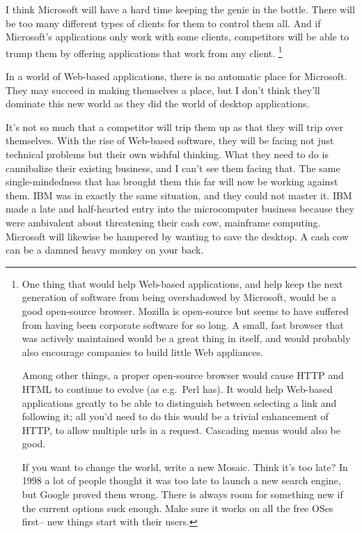\documentclass[12pt]{book}
\begin{document}
I think Microsoft will have a hard time keeping the genie in the bottle.
There will be too many different types of clients for them to control
them all. And if Microsoft's applications only work with some clients,
competitors will be able to trump them by offering applications that
work from any client. \footnote{One thing that would help Web-based applications, and help keep
the next generation of software from being overshadowed by Microsoft,
would be a good open-source browser. Mozilla is open-source but seems to
have suffered from having been corporate software for so long. A small,
fast browser that was actively maintained would be a great thing in
itself, and would probably also encourage companies to build little Web
appliances.

Among other things, a proper open-source browser would cause HTTP and
HTML to continue to evolve (as e.g.~Perl has). It would help Web-based
applications greatly to be able to distinguish between selecting a link
and following it; all you'd need to do this would be a trivial
enhancement of HTTP, to allow multiple urls in a request. Cascading
menus would also be good.

If you want to change the world, write a new Mosaic. Think it's too
late? In 1998 a lot of people thought it was too late to launch a new
search engine, but Google proved them wrong. There is always room for
something new if the current options suck enough. Make sure it works on
all the free OSes first-- new things start with their users.}

In a world of Web-based applications, there is no automatic place for
Microsoft. They may succeed in making themselves a place, but I don't
think they'll dominate this new world as they did the world of desktop
applications.

It's not so much that a competitor will trip them up as that they will
trip over themselves. With the rise of Web-based software, they will be
facing not just technical problems but their own wishful thinking. What
they need to do is cannibalize their existing business, and I can't see
them facing that. The same single-mindedness that has brought them this
far will now be working against them. IBM was in exactly the same
situation, and they could not master it. IBM made a late and
half-hearted entry into the microcomputer business because they were
ambivalent about threatening their cash cow, mainframe computing.
Microsoft will likewise be hampered by wanting to save the desktop. A
cash cow can be a damned heavy monkey on your back.
\end{document}
